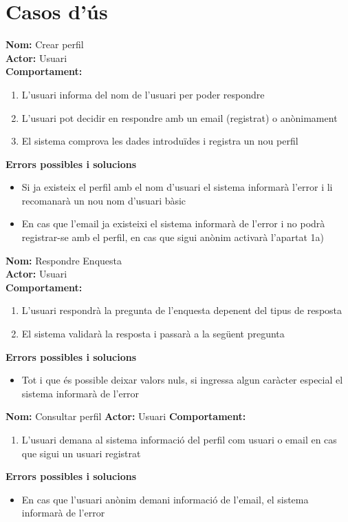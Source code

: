 \documentclass[../main.tex]{subfiles}
\begin{document}
\section{Casos d'ús}
\textbf{Nom:} Crear perfil\\
\textbf{Actor:} Usuari\\
\textbf{Comportament:}
\begin{enumerate}
    \item L’usuari informa del nom de l’usuari per poder respondre
    \item L’usuari pot decidir en respondre amb un email (registrat) o anònimament
    \item El sistema comprova les dades introduïdes i registra un nou perfil
\end{enumerate}
\textbf{Errors possibles i solucions}
\begin{itemize}
    \item Si ja existeix el perfil amb el nom d’usuari el sistema informarà l’error i li recomanarà un nou nom d’usuari bàsic
    \item En cas que l’email ja existeixi el sistema informarà de l’error i no podrà registrar-se amb el perfil, en cas que sigui anònim activarà l’apartat 1a)
\end{itemize}

\vspace{0.5 cm}

\textbf{Nom:} Respondre Enquesta\\
\textbf{Actor:} Usuari\\
\textbf{Comportament:}
\begin{enumerate}
    \item L’usuari respondrà la pregunta de l’enquesta depenent del tipus de resposta
    \item El sistema validarà la resposta i passarà a la següent pregunta
\end{enumerate}
\textbf{Errors possibles i solucions}
\begin{itemize}
    \item Tot i que és possible deixar valors nuls, si ingressa algun caràcter especial el sistema informarà de l’error
\end{itemize}

\vspace{0.5 cm}

\textbf{Nom:} Consultar perfil
\textbf{Actor:} Usuari
\textbf{Comportament:}
\begin{enumerate}
    \item L’usuari demana al sistema informació del perfil com usuari o email en cas que sigui un usuari registrat
\end{enumerate}
\textbf{Errors possibles i solucions}
\begin{itemize}
    \item En cas que l’usuari anònim demani informació de l’email, el sistema informarà de l’error
\end{itemize}
\end{document}
